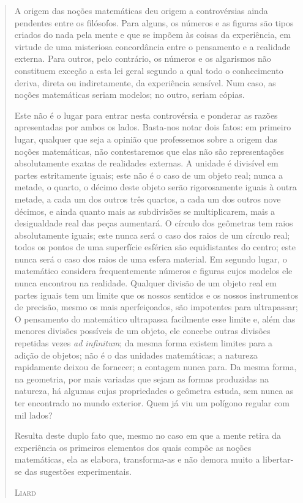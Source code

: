 \documentclass{hipatia}
\begin{document}
\begin{quote}
A origem das noções matemáticas deu origem a controvérsias ainda pendentes entre os filósofos. Para alguns, os números e as figuras são tipos criados do nada pela mente e que se impõem às coisas da experiência, em virtude de uma misteriosa concordância entre o pensamento e a realidade externa. Para outros, pelo contrário, os números e os algarismos não constituem exceção a esta lei geral segundo a qual todo o conhecimento deriva, direta ou indiretamente, da experiência sensível. Num caso, as noções matemáticas seriam modelos; no outro, seriam cópias.

Este não é o lugar para entrar nesta controvérsia e ponderar as razões apresentadas por ambos os lados. Basta-nos notar dois fatos: em primeiro lugar, qualquer que seja a opinião que professemos sobre a origem das noções matemáticas, não contestaremos que elas não são representações absolutamente exatas de realidades externas. A unidade é divisível em partes estritamente iguais; este não é o caso de um objeto real; nunca a metade, o quarto, o décimo deste objeto serão rigorosamente iguais à outra metade, a cada um dos outros três quartos, a cada um dos outros nove décimos, e ainda quanto mais as subdivisões se multiplicarem, mais a desigualdade real das peças aumentará. O círculo dos geômetras tem raios absolutamente iguais; este nunca será o caso dos raios de um círculo real; todos os pontos de uma superfície esférica são equidistantes do centro; este nunca será o caso dos raios de uma esfera material. Em segundo lugar, o matemático considera frequentemente números e figuras cujos modelos ele nunca encontrou na realidade. Qualquer divisão de um objeto real em partes iguais tem um limite que os nossos sentidos e os nossos instrumentos de precisão, mesmo os mais aperfeiçoados, são impotentes para ultrapassar; O pensamento do matemático ultrapassa facilmente esse limite e, além das menores divisões possíveis de um objeto, ele concebe outras divisões repetidas vezes \emph{ad infinitum}; da mesma forma existem limites para a adição de objetos; não é o das unidades matemáticas; a natureza rapidamente deixou de fornecer; a contagem nunca para. Da mesma forma, na geometria, por mais variadas que sejam as formas produzidas na natureza, há algumas cujas propriedades o geômetra estuda, sem nunca as ter encontrado no mundo exterior. Quem já viu um polígono regular com mil lados?

Resulta deste duplo fato que, mesmo no caso em que a mente retira da experiência os primeiros elementos dos quais compõe as noções matemáticas, ela as elabora, transforma-as e não demora muito a libertar-se das sugestões experimentais.

\hfill \textsc{Liard}
\end{quote}
\end{document}
